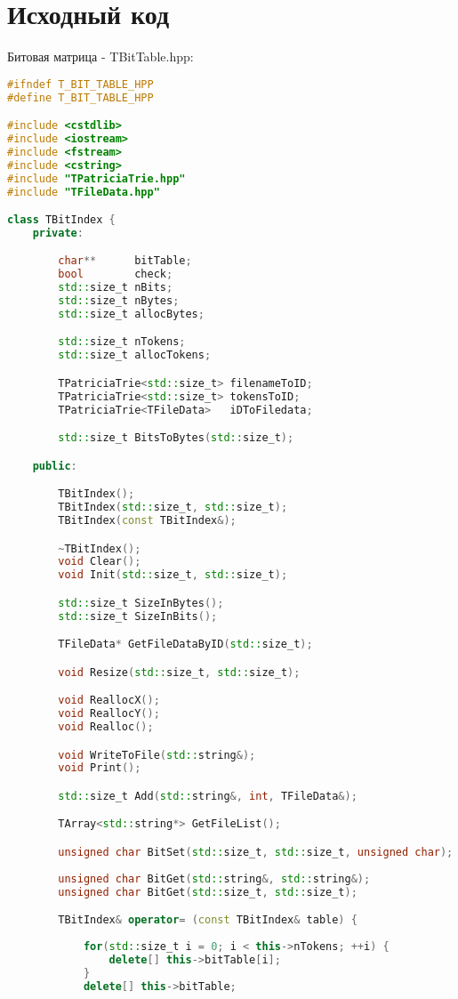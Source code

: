 \section{Исходный код}
Битовая матрица - TBitTable.hpp:
\begin{lstlisting}[language=C++]
#ifndef T_BIT_TABLE_HPP
#define T_BIT_TABLE_HPP

#include <cstdlib>
#include <iostream>
#include <fstream>
#include <cstring>
#include "TPatriciaTrie.hpp"
#include "TFileData.hpp"

class TBitIndex {
    private:

        char**      bitTable;
        bool        check;
        std::size_t nBits;
        std::size_t nBytes;
        std::size_t allocBytes;

        std::size_t nTokens;
        std::size_t allocTokens;

        TPatriciaTrie<std::size_t> filenameToID;
        TPatriciaTrie<std::size_t> tokensToID;
        TPatriciaTrie<TFileData>   iDToFiledata;

        std::size_t BitsToBytes(std::size_t);

    public:

        TBitIndex();
        TBitIndex(std::size_t, std::size_t);
        TBitIndex(const TBitIndex&);

        ~TBitIndex();
        void Clear();
        void Init(std::size_t, std::size_t);

        std::size_t SizeInBytes();
        std::size_t SizeInBits();

        TFileData* GetFileDataByID(std::size_t);

        void Resize(std::size_t, std::size_t);

        void ReallocX();
        void ReallocY();
        void Realloc();

        void WriteToFile(std::string&);
        void Print();

        std::size_t Add(std::string&, int, TFileData&);

        TArray<std::string*> GetFileList();

        unsigned char BitSet(std::size_t, std::size_t, unsigned char);
        
        unsigned char BitGet(std::string&, std::string&);
        unsigned char BitGet(std::size_t, std::size_t);

        TBitIndex& operator= (const TBitIndex& table) {
            
            for(std::size_t i = 0; i < this->nTokens; ++i) {
                delete[] this->bitTable[i];
            }
            delete[] this->bitTable;
            


\end{lstlisting}
